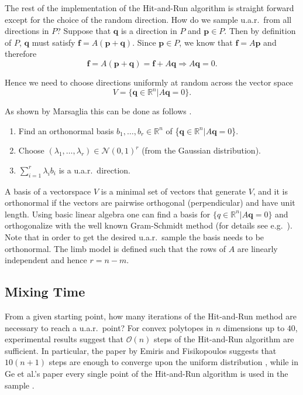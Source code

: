 The rest of the implementation of the Hit-and-Run algorithm is straight forward except for the choice of the random direction. How do we sample u.a.r.\ from all directions in $P$? Suppose that $\textbf{q}$ is a direction in $P$ and $\textbf{p} \in P$. Then by definition of $P$, $\textbf{q}$ must satisfy $\textbf{f} = A(\textbf{p}+\textbf{q})$. Since $\textbf{p} \in P$, we know that $\textbf{f} = A\textbf{p}$ and therefore 
\[\textbf{f} = A(\textbf{p} + \textbf{q}) = \textbf{f} + A\textbf{q} \Rightarrow A\textbf{q} = 0. \]

Hence we need to choose directions uniformly at random across the vector space 
\[V = \{\textbf{q} \in \mathbb{R}^n | A\textbf{q} = 0\}.\]

As shown by Marsaglia this can be done as follows \cite{Marsaglia}.
\begin{enumerate}
\item
Find an orthonormal basis $b_1, \dots, b_r \in \mathbb{R}^{n}$ of \{$\textbf{q} \in \mathbb{R}^n | A\textbf{q} = 0$\}.
\item
Choose $(\lambda_1, \dots, \lambda_r) \in \mathcal{N}(0,1)^r$ (from the Gaussian distribution).
\item
$\sum_{i=1}^r \lambda_i b_i$ is a u.a.r.\ direction.
\end{enumerate}
A basis of a vectorspace $V$ is a minimal set of vectors that generate $V$, and it is orthonormal if the vectors are pairwise orthogonal (perpendicular) and have unit length. Using basic linear algebra one can find a basis for $\{q \in \mathbb{R}^n | A\textbf{q} = 0\}$ and orthogonalize with the well known Gram-Schmidt method (for details see e.g.\ \cite{Robertson}). Note that in order to get the desired u.a.r.\ sample the basis needs to be orthonormal. The limb model is defined such that the rows of $A$ are linearly independent and hence $r=n-m$.

\subsection{Mixing Time}
\label{sec_lengthrun}
From a given starting point, how many iterations of the Hit-and-Run method are necessary to reach a u.a.r.\ point?
For convex polytopes in $n$ dimensions up to $40$, experimental results suggest that $\mathcal{O}(n)$ steps of the Hit-and-Run algorithm are sufficient.
In particular, the paper \cite{emiris2013efficient} by Emiris and Fisikopoulos suggests that $10(n + 1)$ steps are enough to converge upon the uniform distribution \cite{emiris2013efficient}, while in Ge et al.'s paper every single point of the Hit-and-Run algorithm is used in the sample \cite{Ge}. 

